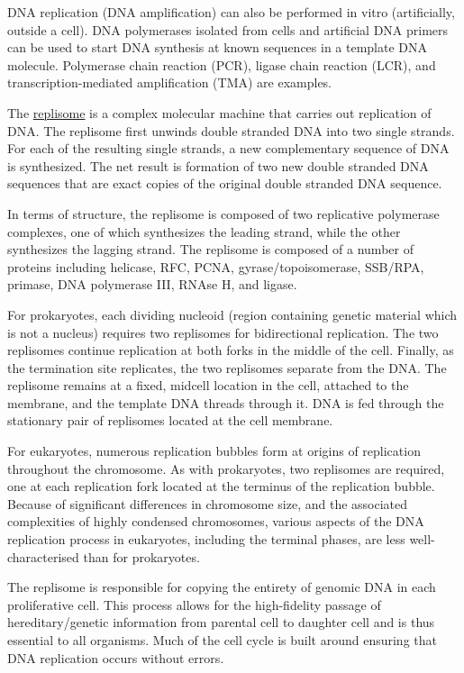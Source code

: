 DNA replication (DNA amplification) can also be performed in vitro (artificially, outside a cell). DNA polymerases isolated from cells and artificial DNA primers can be used to start DNA synthesis at known sequences in a template DNA molecule. Polymerase chain reaction (PCR), ligase chain reaction (LCR), and transcription-mediated amplification (TMA) are examples.

The \href{https://en.wikipedia.org/wiki/Replisome}{replisome} is a complex molecular machine that carries out replication of DNA. The replisome first unwinds double stranded DNA into two single strands. For each of the resulting single strands, a new complementary sequence of DNA is synthesized. The net result is formation of two new double stranded DNA sequences that are exact copies of the original double stranded DNA sequence.

In terms of structure, the replisome is composed of two replicative polymerase complexes, one of which synthesizes the leading strand, while the other synthesizes the lagging strand. The replisome is composed of a number of proteins including helicase, RFC, PCNA, gyrase/topoisomerase, SSB/RPA, primase, DNA polymerase III, RNAse H, and ligase.

For prokaryotes, each dividing nucleoid (region containing genetic material which is not a nucleus) requires two replisomes for bidirectional replication. The two replisomes continue replication at both forks in the middle of the cell. Finally, as the termination site replicates, the two replisomes separate from the DNA. The replisome remains at a fixed, midcell location in the cell, attached to the membrane, and the template DNA threads through it. DNA is fed through the stationary pair of replisomes located at the cell membrane.

For eukaryotes, numerous replication bubbles form at origins of replication throughout the chromosome. As with prokaryotes, two replisomes are required, one at each replication fork located at the terminus of the replication bubble. Because of significant differences in chromosome size, and the associated complexities of highly condensed chromosomes, various aspects of the DNA replication process in eukaryotes, including the terminal phases, are less well-characterised than for prokaryotes.

The replisome is responsible for copying the entirety of genomic DNA in each proliferative cell. This process allows for the high-fidelity passage of hereditary/genetic information from parental cell to daughter cell and is thus essential to all organisms. Much of the cell cycle is built around ensuring that DNA replication occurs without errors.



